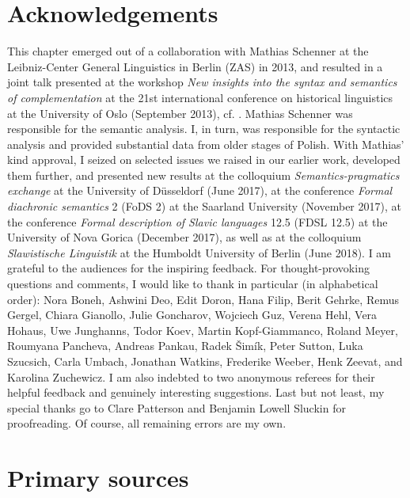 \documentclass[output=paper]{langsci/langscibook}
\begin{document}
\section*{Acknowledgements} This chapter emerged out of a collaboration with Mathias Schenner at the Leib\-niz-Center General Linguistics in Berlin (ZAS) in 2013, and resulted in a joint talk presented at the workshop \emph{New insights into the syntax and semantics of complementation} at the 21st international conference on historical linguistics at the University of Oslo (September 2013), cf. \textcite{JedrzejowskiSchenner-2013}. Mathias Schenner was responsible for the semantic analysis. I, in turn, was responsible for the syntactic analysis and provided substantial data from older stages of Polish. With Mathias'  kind approval, I seized on selected issues we raised in our earlier work, developed them further, and presented new results at the colloquium \emph{Semantics-pragmatics exchange} at the University of Düsseldorf (June 2017), at the conference \emph{Formal diachronic semantics} 2 (FoDS 2) at the Saarland University (November 2017), at the conference \emph{Formal description of Slavic languages} 12.5 (FDSL 12.5) at the University of Nova Gorica (December 2017), as well as at the colloquium \emph{Slawistische Linguistik} at the Humboldt University of Berlin (June 2018). I am grateful to the audiences for the inspiring feedback. For thought-provoking questions and comments, I would like to thank in particular (in alphabetical order): Nora Boneh, Ashwini Deo, Edit Doron, Hana Filip, Berit Gehrke, Remus Gergel, Chiara Gianollo, Julie Goncharov, Wojciech Guz, Verena Hehl, Vera Hohaus, Uwe Junghanns, Todor Koev, Martin Kopf-Giammanco, Roland Meyer, Roumyana Pancheva, Andreas Pankau, Radek Šimík, Peter Sutton, Luka Szucsich, Carla Umbach, Jonathan Watkins, Frederike Weeber, Henk Zeevat, and Karolina Zuchewicz. I am also indebted to two anonymous referees for their helpful feedback and genuinely interesting suggestions. Last but not least, my special thanks go to Clare Patterson and Benjamin Lowell Sluckin for proofreading. Of course, all remaining errors are my own.

\section*{Primary sources}
\end{document}
